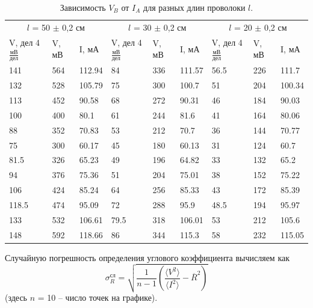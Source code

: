 \documentclass[12pt,a4paper]{article}
\begin{document}
\begin{table}[!ht]
    \label{tbl:tb2}
     \caption{\newline Зависимость $V_B$ от $I_A$ для разных длин проволоки $l$.}
    \centering
    \begin{tabular}{|p{1.3cm}|l|l|p{1.3cm}|l|l|p{1.3cm}|l|l|}
    \hline 
        \multicolumn{3}{|c|}{ $l$ = 50 $\pm$ 0,2 см} & \multicolumn{3}{|c|}{ $l$ = 30 $\pm$ 0,2 см} & \multicolumn{3}{|c|}{ $l$ = 20 $\pm$ 0,2 см} \\ \hline
        {V, дел \newline 4 $\frac {мВ} {дел}$} & V, мВ & I, мА & {V, дел \newline 4 $\frac {мВ} {дел}$} & V, мВ & I, мА & {V, дел \newline 4 $\frac {мВ} {дел}$} & V, мВ & I, мА \\ \hline
        141 & 564 & 112.94 & 84 & 336 & 111.57 & 56.5 & 226 & 111.7 \\ \hline
        132 & 528 & 105.79 & 75 & 300 & 100.7 & 51 & 204 & 100.34 \\ \hline
        113 & 452 & 90.58 & 68 & 272 & 90.31 & 46 & 184 & 90.03 \\ \hline
        100 & 400 & 80.1 & 61 & 244 & 81.6 & 41 & 164 & 80.06 \\ \hline
        88 & 352 & 70.83 & 53 & 212 & 70.7 & 36 & 144 & 70.77 \\ \hline
        75 & 300 & 60.17 & 45 & 180 & 60.13 & 31 & 124 & 60.7 \\ \hline
        81.5 & 326 & 65.23 & 49 & 196 & 64.82 & 33 & 132 & 65.2 \\ \hline
        94 & 376 & 75.36 & 51 & 204 & 75.01 & 38 & 152 & 75.22 \\ \hline
        106 & 424 & 85.24 & 64 & 256 & 85.33 & 43 & 172 & 85.39 \\ \hline
        118.5 & 474 & 95.09 & 72 & 288 & 95.9 & 48.5 & 194 & 95.97 \\ \hline
        133 & 532 & 106.61 & 79.5 & 318 & 106.01 & 53 & 212 & 105.6 \\ \hline
        148 & 592 & 118.66 & 86 & 344 & 115.3 & 58 & 232 & 115.05 \\ \hline
    \end{tabular}
\end{table}

Случайную погрешность определения углового коэффициента вычисляем как
\begin{equation}
    \sigma ^{сл} _{R} = \sqrt{ \frac{1}{n-1} \left(\frac{\langle V^2 \rangle}{\langle I^2 \rangle} - \overline{R}^2\right) }
\end{equation}
(здесь $n$ = 10 – число точек на графике).
\end{document}
